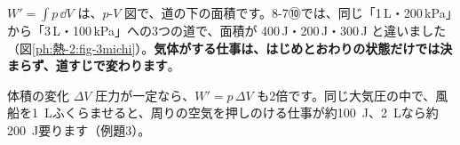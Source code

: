 \begin{phflow}[気体がする仕事]
\end{phflow}

$W'=\int p\,\dd V$ は、$p$-$V$ 図で、道の下の面積です。8-7⑩では、同じ「1\,L・200\,kPa」から「3\,L・100\,kPa」への3つの道で、面積が 400\,J・200\,J・300\,J と違いました（図\ref{ph:熱-2:fig-3michi}）。\textbf{気体がする仕事は、はじめとおわりの状態だけでは決まらず、道すじで変わります}。

\begin{phbaisuru}{体積の変化 $\Delta V$}
圧力が一定なら、$W'=p\,\Delta V$ も2倍です。同じ大気圧の中で、風船を\qty{1}{L}ふくらませると、周りの空気を押しのける仕事が約\qty{100}{J}、\qty{2}{L}なら約\qty{200}{J}要ります（例題3）。
\end{phbaisuru}

